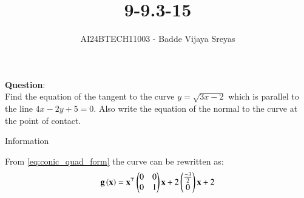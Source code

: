 \documentclass[journal]{IEEEtran}
\begin{document}

\vspace{3cm}

\title{9-9.3-15}
\author{AI24BTECH11003 - Badde Vijaya Sreyas}
{\let\newpage\relax\maketitle}

\renewcommand{\thefigure}{\theenumi}
\renewcommand{\thetable}{\theenumi}
\setlength{\intextsep}{10pt} %


\renewcommand{\thetable}{\theenumi}


\textbf{Question}:\\
Find the equation of the tangent to the curve $y= \sqrt{3x-2}$ which is parallel to the line $4x-2y+5=0$. Also write the equation of the normal to the curve at the point of contact.


\solution
\begin{table}[h!]
	\centering
	
	\caption{Information}
	\label{tab:9-9.3-15}
\end{table}

From \eqref{eq:conic_quad_form} the curve can be rewritten as:
\begin{align}
    \mathbf{g}\left(\mathbf{x}\right) = \mathbf{x}^\top \begin{pmatrix}0&0\\0&1\end{pmatrix}\mathbf{x} + 2\begin{pmatrix}\frac{-3}{2}\\0\end{pmatrix}\mathbf{x}+2
\end{align}
\end{document}
